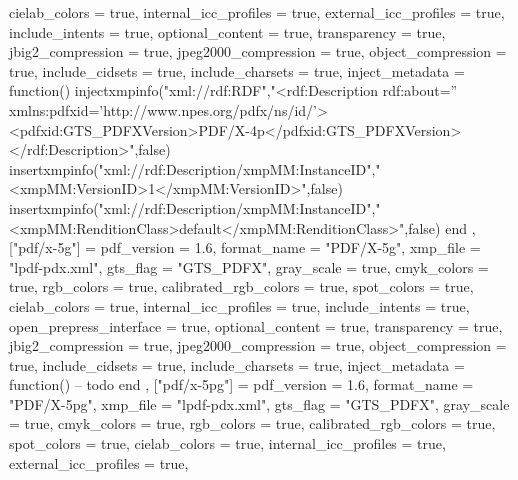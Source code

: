 {{            cielab_colors           = true,
            internal_icc_profiles   = true,
            external_icc_profiles   = true,
            include_intents         = true,
            optional_content        = true,
            transparency            = true,
            jbig2_compression       = true,
            jpeg2000_compression    = true,
            object_compression      = true,
            include_cidsets         = true,
            include_charsets        = true,
            inject_metadata         = function()
                injectxmpinfo("xml://rdf:RDF","<rdf:Description rdf:about='' xmlns:pdfxid='http://www.npes.org/pdfx/ns/id/'><pdfxid:GTS_PDFXVersion>PDF/X-4p</pdfxid:GTS_PDFXVersion></rdf:Description>",false)
                insertxmpinfo("xml://rdf:Description/xmpMM:InstanceID","<xmpMM:VersionID>1</xmpMM:VersionID>",false)
                insertxmpinfo("xml://rdf:Description/xmpMM:InstanceID","<xmpMM:RenditionClass>default</xmpMM:RenditionClass>",false)
            end
        },
        ["pdf/x-5g"] = {
            pdf_version             = 1.6,
            format_name             = "PDF/X-5g",
            xmp_file                = "lpdf-pdx.xml",
            gts_flag                = "GTS_PDFX",
            gray_scale              = true,
            cmyk_colors             = true,
            rgb_colors              = true,
            calibrated_rgb_colors   = true,
            spot_colors             = true,
            cielab_colors           = true,
            internal_icc_profiles   = true,
            include_intents         = true,
            open_prepress_interface = true,
            optional_content        = true,
            transparency            = true,
            jbig2_compression       = true,
            jpeg2000_compression    = true,
            object_compression      = true,
            include_cidsets         = true,
            include_charsets        = true,
            inject_metadata         = function()
                -- todo
            end
        },
        ["pdf/x-5pg"] = {
            pdf_version             = 1.6,
            format_name             = "PDF/X-5pg",
            xmp_file                = "lpdf-pdx.xml",
            gts_flag                = "GTS_PDFX",
            gray_scale              = true,
            cmyk_colors             = true,
            rgb_colors              = true,
            calibrated_rgb_colors   = true,
            spot_colors             = true,
            cielab_colors           = true,
            internal_icc_profiles   = true,
            external_icc_profiles   = true,
}}
